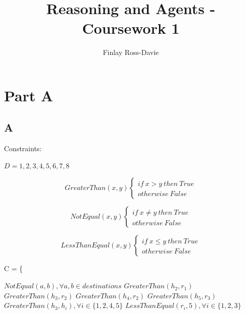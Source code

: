 \documentclass{article}
\title{Reasoning and Agents - Coursework 1}
\author{Finlay Ross-Davie}
\begin{document}
\maketitle

\section{Part A}

\subsection{A}

Constraints:

$D = {1,2,3,4,5,6,7,8}$

\begin{equation}
GreaterThan(x,y)
    \begin{cases}
        if \: x > y \: then \: True \\
        otherwise \: False
    \end{cases}
\end{equation}

\begin{equation}
NotEqual(x,y)
    \begin{cases}
        if \: x \neq y \: then \: True \\
        otherwise \: False
    \end{cases}
\end{equation}

\begin{equation}
LessThanEqual(x,y)
    \begin{cases}
        if \: x \leq y \: then \: True \\
        otherwise \: False
    \end{cases}
\end{equation}


C = \{\

$NotEqual(a,b), \forall a, b \in destinations$ \newline
$GreaterThan(h_2,r_1)$ \newline
$GreaterThan(h_3, r_2)$ \newline
$GreaterThan(h_4, r_2)$ \newline
$GreaterThan(h_5, r_3)$ \newline
$GreaterThan(h_3,h_i), \forall i \in \{1,2,4,5\}$ \newline
$LessThanEqual(r_i,5), \forall i \in \{1,2,3\}$ \newline 
\end{document}
